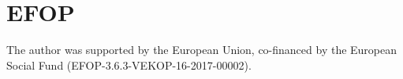 \documentclass[runningheads,a4paper]{report}
\theoremstyle{definition}
\begin{document}
\section{EFOP}
{\Large
    The author was supported by the European Union, co-financed by the European Social Fund (EFOP-3.6.3-VEKOP-16-2017-00002).
}

\newpage
{}


  
% 


{}




\end{document}
